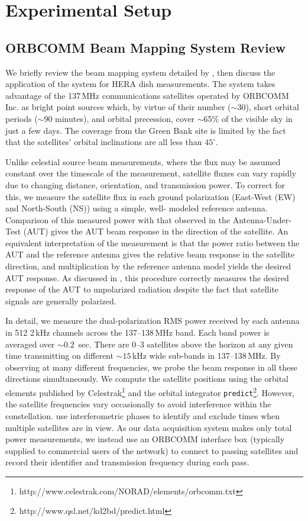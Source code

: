 \documentclass{emulateapj}
\begin{document}
\section{Experimental Setup}

\subsection{ORBCOMM Beam Mapping System Review}
\label{sec:orbcommreview}

We briefly review the beam mapping system detailed by \citet{neben15}, then discuss the 
application of the system for HERA dish measurements. The system 
takes advantage of the 137\,MHz communications satellites operated by ORBCOMM Inc. 
as bright point sources which, by virtue of their number ($\sim30$), short orbital periods 
($\sim90$ minutes), and orbital precession, cover $\sim$65\% of the visible sky in just a few 
days. The coverage from the Green Bank site is limited by the fact that the satellites' orbital inclinations are all less 
than $45^\circ$. 

Unlike celestial source beam measurements, where the flux may be 
assumed constant over the timescale of the measurement, satellite fluxes can vary rapidly 
due to changing distance, orientation, and transmission power. To correct for this, we 
measure the satellite flux in each ground polarization (East-West (EW) and North-South (NS)) using a simple, well-
modeled reference antenna. Comparison of this measured power with that observed in the 
Antenna-Under-Test (AUT) gives the AUT beam response in the direction of the satellite. 
An equivalent interpretation of the measurement is that the power ratio between the AUT and the reference 
antenna gives the relative beam response in the satellite direction, and multiplication by 
the reference antenna model yields the desired AUT response. As discussed in 
\citet{neben15}, this procedure correctly measures the desired response of the AUT to unpolarized radiation despite the fact that satellite signals are generally polarized.

In detail, we measure the dual-polarization RMS power received by each antenna in 512 2\,kHz 
channels across the 137--138\,MHz band. Each band power is averaged over $\sim0.2$
\,sec. There are 0--3 satellites above the horizon at any given time transmitting on different 
$\sim15$\,kHz wide sub-bands in 137--138\,MHz. By observing at many different 
frequencies, we probe the beam response in all these directions simultaneously. We 
compute the satellite positions using the orbital elements published by Celestrak\footnote{http://www.celestrak.com/NORAD/elements/orbcomm.txt} and the orbital 
integrator \texttt{predict}\footnote{http://www.qsl.net/kd2bd/predict.html}. However, the 
satellite frequencies vary occasionally to avoid interference within the constellation. 
\citet{zheng14} use interferometric phases to identify and exclude times when multiple 
satellites are in view. As our data acquisition system makes only total power 
measurements, we instead use an ORBCOMM interface box (typically supplied to 
commercial users of the network) to connect to passing satellites and record their identifier 
and transmission frequency during each pass.
\end{document}
